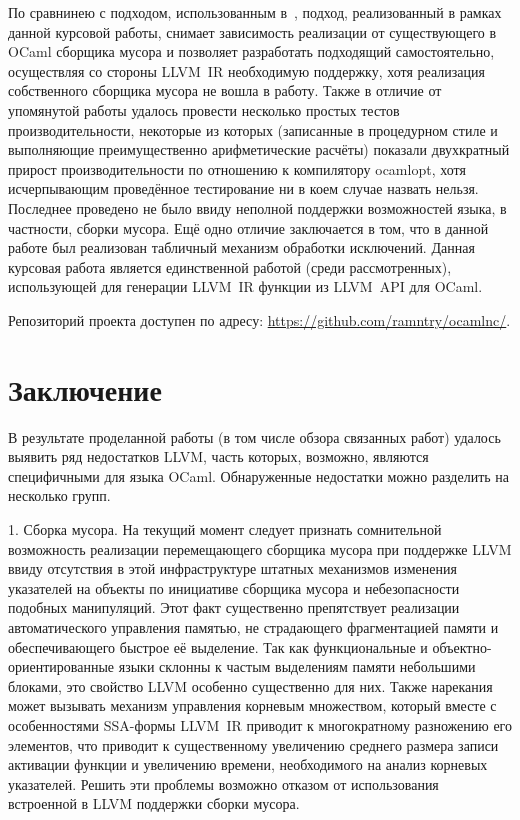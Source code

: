 \documentclass[a4paper, 12pt]{article}
\begin{document}
По сравнинею с подходом, использованным в~\cite{Benner}, подход, реализованный в рамках данной курсовой работы,
снимает зависимость реализации от существующего в OCaml сборщика мусора и позволяет разработать подходящий
самостоятельно, осуществляя со стороны LLVM~IR необходимую поддержку, хотя реализация собственного сборщика мусора не
вошла в работу. Также в отличие от упомянутой работы удалось провести несколько простых тестов производительности,
некоторые из которых (записанные в процедурном стиле и выполняющие преимущественно арифметические расчёты) показали
двухкратный прирост производительности по отношению к компилятору ocamlopt, хотя исчерпывающим проведённое тестирование
ни в коем случае назвать нельзя. Последнее проведено не было ввиду неполной поддержки возможностей языка, в
частности, сборки мусора. Ещё одно отличие заключается в том, что в данной работе был реализован табличный механизм
обработки исключений. Данная курсовая работа является единственной работой (среди рассмотренных), использующей для
генерации LLVM~IR функции из LLVM~API для OCaml.

Репозиторий проекта доступен по адресу: \url{https://github.com/ramntry/ocamlnc/}.

\newpage
\section*{Заключение}

В результате проделанной работы (в том числе обзора связанных работ) удалось выявить ряд недостатков LLVM, часть
которых, возможно, являются специфичными для языка OCaml. Обнаруженные недостатки можно разделить на несколько групп.

1. Сборка мусора.
На текущий момент следует признать сомнительной возможность реализации перемещающего сборщика мусора при поддержке
LLVM ввиду отсутствия в этой инфраструктуре штатных механизмов изменения указателей на объекты по инициативе сборщика
мусора и небезопасности подобных манипуляций. Этот факт существенно препятствует
реализации автоматического управления памятью, не страдающего фрагментацией памяти и обеспечивающего быстрое её
выделение. Так как функциональные и объектно-ориентированные языки склонны к частым выделениям памяти небольшими
блоками, это свойство LLVM особенно существенно для них. Также нарекания может вызывать механизм управления корневым
множеством, который вместе с особенностями SSA-формы LLVM~IR приводит к многократному разножению его элементов, что
приводит к существенному увеличению среднего размера записи активации функции и увеличению времени, необходимого на
анализ корневых указателей. Решить эти проблемы возможно отказом от использования встроенной в LLVM поддержки сборки
мусора.
\end{document}
